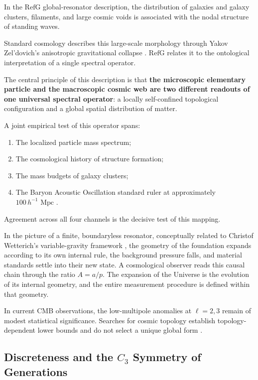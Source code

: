 \documentclass[11pt,a4paper]{article}
\newcommand{\RefG}{\mathrm{RefG}}
\begin{document}
In the $\RefG$ global-resonator description, the distribution of galaxies and galaxy clusters, filaments, and large cosmic voids is associated with the nodal structure of standing waves.

Standard cosmology describes this large-scale morphology through Yakov Zel'dovich's anisotropic gravitational collapse \citep{zeldovich1970}. $\RefG$ relates it to the ontological interpretation of a single spectral operator.

The central principle of this description is that \textbf{the microscopic elementary particle and the macroscopic cosmic web are two different readouts of one universal spectral operator}: a locally self-confined topological configuration and a global spatial distribution of matter.

\begin{samepage}
A joint empirical test of this operator spans:
\begin{enumerate}[label=\arabic*.]
\item The localized particle mass spectrum;
\item The cosmological history of structure formation;
\item The mass budgets of galaxy clusters;
\item The Baryon Acoustic Oscillation standard ruler at approximately $100\,h^{-1}\text{ Mpc}$ \citep{eisenstein2005}.
\end{enumerate}
\end{samepage}

Agreement across all four channels is the decisive test of this mapping.

In the picture of a finite, boundaryless resonator, conceptually related to Christof Wetterich's variable-gravity framework \citep{wetterich2013}, the geometry of the foundation expands according to its own internal rule, the background pressure falls, and material standards settle into their new state. A cosmological observer reads this causal chain through the ratio $A=a/p$. The expansion of the Universe is the evolution of its internal geometry, and the entire measurement procedure is defined within that geometry.

In current CMB observations, the low-multipole anomalies at $\ell=2,3$ remain of modest statistical significance. Searches for cosmic topology establish topology-dependent lower bounds and do not select a unique global form \citep{planck2016}.
\subsection{Discreteness and the \texorpdfstring{$C_3$}{C3} Symmetry of Generations}
\end{document}
